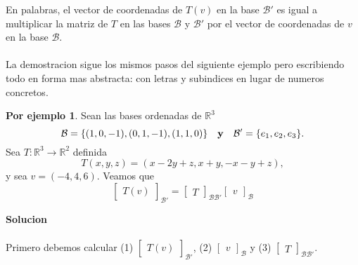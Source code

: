 \documentclass{article}
\theoremstyle{definition}
\theoremstyle{definition}
\newtheorem*{ej}{Por ejemplo}
\theoremstyle{remark}
\begin{document}
En palabras, el vector de coordenadas de $T(v)$ en la base $\mathcal{B}'$  es igual a multiplicar la matriz de $T$ en las bases $\mathcal{B}$ y $\mathcal{B}'$ por el vector de coordenadas de $v$ en la base $\mathcal{B}$.
\\\\ 
La demostracion sigue los mismos pasos del siguiente ejemplo pero escribiendo todo en forma mas abstracta: con letras y subindices en lugar de numeros concretos.
\begin{ej}
  Sean las bases ordenadas de $\mathbb{R}^3$ \[
    \mathcal{B}=\{(1,0,-1),(0,1,-1),(1,1,0)\} \quad \textbf{\text{y}} \quad \mathcal{B}'=\{e_1,e_2,e_3\}.
  \]
  Sea $T : \mathbb{R}^3 \to \mathbb{R}^2$ definida \[
T(x,y,z)=(x-2y+z,x+y,-x-y+z),
  \]
  y sea $v = (-4,4,6)$. Veamos que \[
    \begin{bmatrix}
T(v)
\end{bmatrix}_{\mathcal{B}'}
=
\begin{bmatrix}
T
\end{bmatrix}_{\mathcal{B}\mathcal{B}'}
\begin{bmatrix}
v
\end{bmatrix}_{\mathcal{B}}
  \]
\end{ej}
\textbf{Solucion}\\\\
Primero debemos calcular (1) $    \begin{bmatrix}
T(v)
\end{bmatrix}_{\mathcal{B}'}$,  (2) $\begin{bmatrix}
v
\end{bmatrix}_{\mathcal{B}}$  y  (3) $\begin{bmatrix}
T
\end{bmatrix}_{\mathcal{B}\mathcal{B}'}$. \pagebreak
\end{document}

